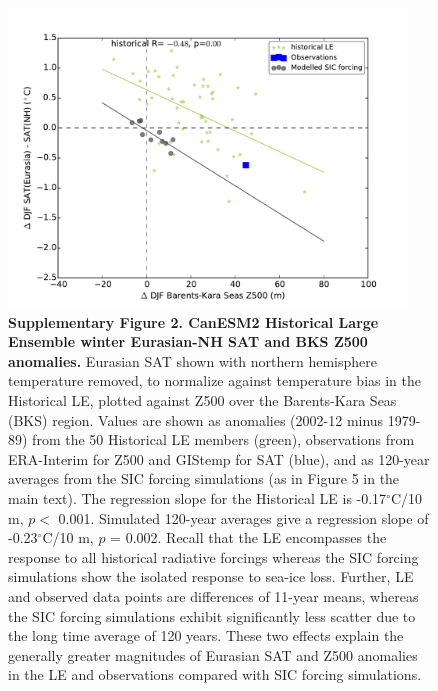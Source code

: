 \documentclass{nature}
\begin{document}
\begin{figure}%
\centering
\noindent\includegraphics[width=25pc]{SuppFigure2_nhremoved_simsadded.pdf}
\caption{\textbf{Supplementary Figure 2. CanESM2 Historical Large Ensemble winter Eurasian-NH SAT and BKS Z500 anomalies.} Eurasian SAT shown with northern hemisphere temperature removed, to normalize against temperature bias in the Historical LE, plotted against Z500 over the Barents-Kara Seas (BKS) region. Values are shown as anomalies (2002-12 minus 1979-89) from the 50 Historical LE members (green), observations from ERA-Interim for Z500 and GIStemp for SAT (blue), and as 120-year averages from the SIC forcing simulations (as in Figure 5 in the main text). The regression slope for the Historical LE is -0.17$^\circ$C/10 m, $p <$ 0.001. Simulated 120-year averages give a regression slope of -0.23$^\circ$C/10 m, $p$ = 0.002. Recall that the LE encompasses the response to all historical radiative forcings whereas the SIC forcing simulations show the isolated response to sea-ice loss. Further, LE and observed data points are differences of 11-year means, whereas the SIC forcing simulations exhibit significantly less scatter due to the long time average of 120 years. These two effects explain the generally greater magnitudes of Eurasian SAT and Z500 anomalies in the LE and observations compared with SIC forcing simulations.
}
\label{fig:supp2b} 
\end{figure}
\end{document}
